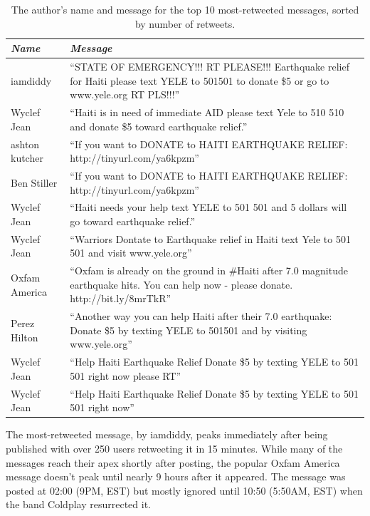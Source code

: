 \documentclass[a4paper, 11pt, titlepage]{article}
\begin{document}
\begin{center}
  \begin{table}[!ht]
    \caption{The author's name and message for the top 10 most-retweeted messages, sorted by number of retweets.}
  \begin{tabular}{| l | p{9.5cm} |}
    \hline
    \textit{Name} & \textit{Message} \\
    \hline
    iamdiddy & ``STATE OF EMERGENCY!!! RT PLEASE!!! Earthquake relief for Haiti please text YELE to 501501 to donate \$5 or go to www.yele.org RT PLS!!!'' \\
    \hline
    Wyclef Jean & ``Haiti is in need of immediate AID please text Yele to 510 510 and donate \$5 toward earthquake relief.'' \\
    \hline
    ashton kutcher & ``If you want to DONATE to HAITI EARTHQUAKE RELIEF: http://tinyurl.com/ya6kpzm'' \\
    \hline
    Ben Stiller & ``If you want to DONATE to HAITI EARTHQUAKE RELIEF: http://tinyurl.com/ya6kpzm'' \\
    \hline
    Wyclef Jean & ``Haiti needs your help text YELE to 501 501 and 5 dollars will go toward earthquake relief.'' \\
    \hline
    Wyclef Jean & ``Warriors Dontate to Earthquake relief in Haiti text Yele to  501 501 and visit www.yele.org'' \\
    \hline
    Oxfam America & ``Oxfam is already on the ground in \#Haiti after 7.0 magnitude earthquake hits. You can help now - please donate. http://bit.ly/8mrTkR'' \\
    \hline
    Perez Hilton & ``Another way you can help Haiti after their 7.0 earthquake: Donate \$5 by texting YELE to 501501 and by visiting www.yele.org'' \\
    \hline
    Wyclef Jean & ``Help Haiti Earthquake Relief Donate \$5 by texting YELE to 501 501 right now please RT'' \\
    \hline
    Wyclef Jean & ``Help Haiti Earthquake Relief Donate \$5 by texting YELE to 501 501 right now'' \\
    \hline
  \end{tabular}
  \label{ref:top_retweets_table}
  \end{table}
\end{center}

The most-retweeted message, by iamdiddy, peaks immediately after being published with over 250 users retweeting it in 15 minutes.  While many of the messages reach their apex shortly after posting, the popular Oxfam America message doesn't peak until nearly 9 hours after it appeared.  The message was posted at 02:00 (9PM, EST) but mostly ignored until 10:50 (5:50AM, EST) when the band Coldplay resurrected it.
\end{document}
